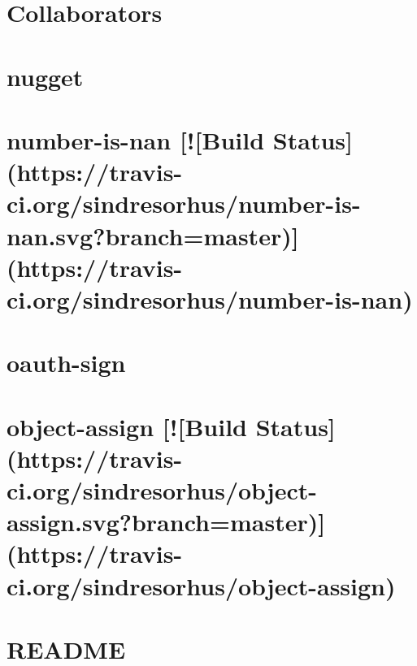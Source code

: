 \documentclass[twoside]{book}
\newcommand{\+}{\discretionary{\mbox{\scriptsize$\hookleftarrow$}}{}{}}
\begin{document}
\chapter{Collaborators}
\label{md_dsmacc_examples_DRmerge_node_modules_nugget_collaborators}

\chapter{nugget}
\label{md_dsmacc_examples_DRmerge_node_modules_nugget_readme}

\chapter{number-\/is-\/nan \mbox{[}!\mbox{[}Build Status\mbox{]}(https\+://travis-\/ci.org/sindresorhus/number-\/is-\/nan.svg?branch=master)\mbox{]}(https\+://travis-\/ci.org/sindresorhus/number-\/is-\/nan)}
\label{md_dsmacc_examples_DRmerge_node_modules_number-is-nan_readme}

\chapter{oauth-\/sign}
\label{md_dsmacc_examples_DRmerge_node_modules_oauth-sign_README}

\chapter{object-\/assign \mbox{[}!\mbox{[}Build Status\mbox{]}(https\+://travis-\/ci.org/sindresorhus/object-\/assign.svg?branch=master)\mbox{]}(https\+://travis-\/ci.org/sindresorhus/object-\/assign)}
\label{md_dsmacc_examples_DRmerge_node_modules_object-assign_readme}

\chapter{R\+E\+A\+D\+ME}
\label{md_dsmacc_examples_DRmerge_node_modules_object-keys_README}

\end{document}
